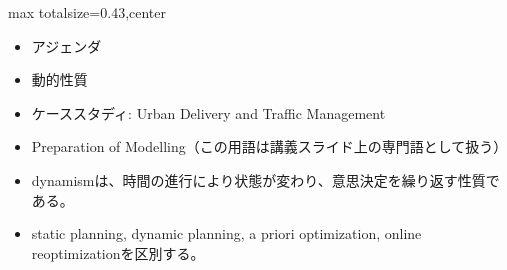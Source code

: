 \clearpage
{}
\begin{minipage}[t]{0.405\textwidth}
\begin{adjustbox}{max totalsize={\textwidth}{0.43\textheight},center}
\begin{minipage}{\textwidth}\scriptsize
{}\begin{itemize}
\item アジェンダ
\item 動的性質
\item ケーススタディ: Urban Delivery and Traffic Management
\item Preparation of Modelling（この用語は講義スライド上の専門語として扱う）
\end{itemize}\begin{itemize}
\item dynamismは、時間の進行により状態が変わり、意思決定を繰り返す性質である。
\item static planning, dynamic planning, a priori optimization, online reoptimizationを区別する。
\end{itemize}
\end{minipage}
\end{adjustbox}
\end{minipage}\hfill
